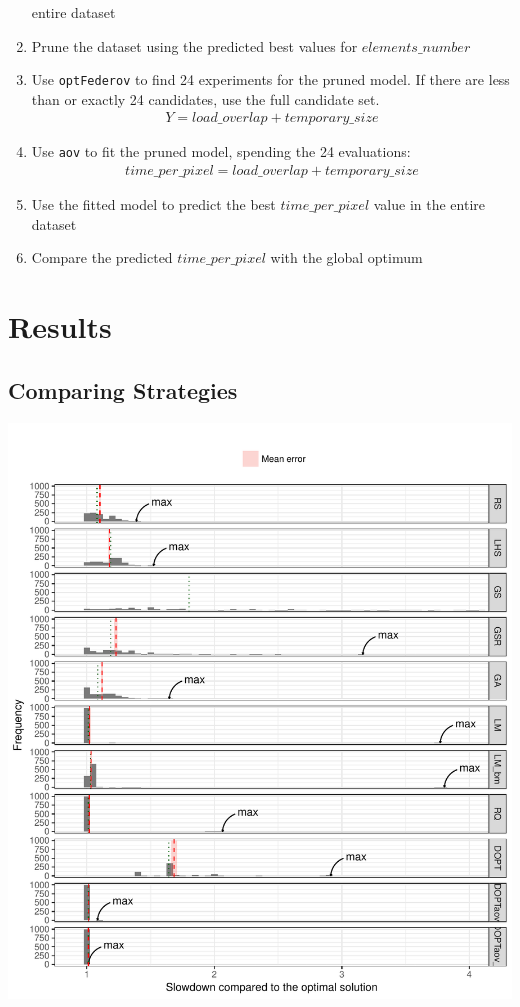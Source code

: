 \documentclass[final,12pt,a4paper]{article}
\begin{document}
\begin{enumerate}
entire dataset
\item Prune the dataset using the predicted best values for \(elements\_number\)
\item Use \texttt{optFederov} to find 24 experiments for the pruned model. If there are less
than or exactly 24 candidates, use the full candidate set.
\begin{align*}
    Y = load\_overlap + temporary\_size
\end{align*}
\item Use \texttt{aov} to fit the pruned model, spending the 24 evaluations:
\begin{align*}
      time\_per\_pixel = load\_overlap + temporary\_size
\end{align*}
\item Use the fitted model to predict the best \(time\_per\_pixel\) value in the
entire dataset
\item Compare the predicted \(time\_per\_pixel\) with the global optimum
\end{enumerate}
\section{Results}
\label{sec:orgbb092d2}
\subsection{Comparing Strategies}
\label{sec:org8b4fd96}
\begin{center}
\includegraphics[width=.9\linewidth]{../img/comparison_histogram.pdf}
\end{center}
\end{document}
